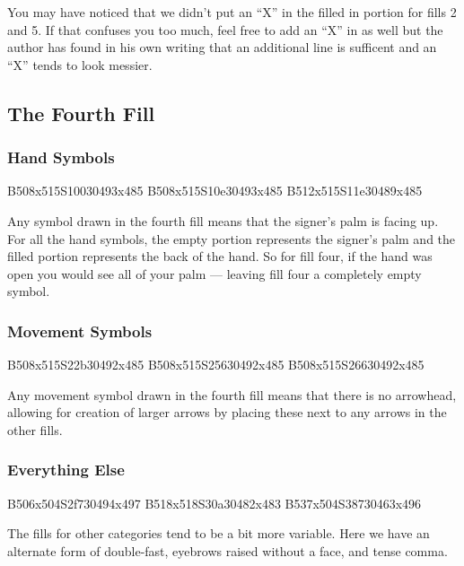 \documentclass{article}
\begin{document}
You may have noticed that we didn't put an ``X'' in the filled in portion for fills 2 and 5.
If that confuses you too much, feel free to add an ``X'' in as well but the author has found in his own writing that an additional line is sufficent and an ``X'' tends to look messier.

\subsection{The Fourth Fill}

\subsubsection{Hand Symbols}

\begin{center}
B508x515S10030493x485 B508x515S10e30493x485 B512x515S11e30489x485
\end{center}

Any symbol drawn in the fourth fill means that the signer's palm is facing up.
For all the hand symbols, the empty portion represents the signer's palm and the filled portion represents the back of the hand.
So for fill four, if the hand was open you would see all of your palm --- leaving fill four a completely empty symbol.

\subsubsection{Movement Symbols}

\begin{center}
B508x515S22b30492x485 B508x515S25630492x485 B508x515S26630492x485
\end{center}

Any movement symbol drawn in the fourth fill means that there is no arrowhead, allowing for creation of larger arrows by placing these next to any arrows in the other fills.

\subsubsection{Everything Else}

\begin{center}
B506x504S2f730494x497 B518x518S30a30482x483 B537x504S38730463x496
\end{center}

The fills for other categories tend to be a bit more variable.
Here we have an alternate form of double-fast, eyebrows raised without a face, and tense comma.
\end{document}
